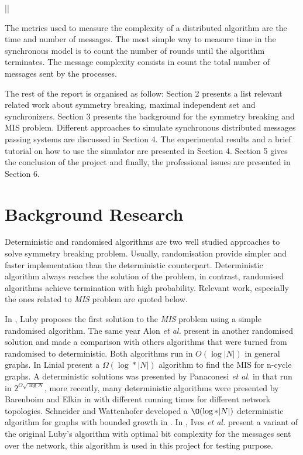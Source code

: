||\documentclass[11pt]{article} %
\theoremstyle{plain}
\theoremstyle{definition}
\begin{document}
The metrics used to measure the complexity of a distributed algorithm are the time and number of messages. The most simple way to measure time in the synchronous model is to count the number of rounds until the algorithm terminates. The message complexity consists in count the total number of messages sent by the processes. 

The rest of the report is organised as follow: Section 2 presents a list relevant related work about symmetry breaking, maximal independent set and synchronizers. Section 3 presents the background for the symmetry breaking and MIS problem. Different approaches to simulate synchronous distributed messages passing systems are discussed in Section 4. The experimental results and a brief tutorial on how to use the simulator are presented in Section 4. Section 5 gives the conclusion of the project and finally, the professional issues are presented in Section 6. 




\section{Background Research}
 
Deterministic and randomised algorithms are two well studied approaches to solve symmetry breaking problem. Usually, randomisation provide simpler and faster implementation than the deterministic counterpart. Deterministic algorithm always reaches the solution of the problem, in contrast, randomised algorithms achieve termination with high probability. Relevant work, especially the ones related to \textit{MIS} problem are quoted below.

In \cite{luby1986simple}, Luby proposes the first solution to the \textit{MIS} problem using a simple randomised algorithm. The same year Alon \textit{et al.} present in \cite{alon1986fast} another randomised solution and made a comparison with others algorithms that were turned from randomised to deterministic. Both algorithms run in $O(\log |N|)$ in general graphs. In \cite{linial1992locality} Linial present a $\Omega(\log* |N|)$ algorithm to find the MIS for n-cycle graphs. A deterministic solutions was presented by Panaconesi \textit{et al.} in \cite{panconesi1996complexity} that run in $2^{O\sqrt{\log N}}$, more recently, many deterministic algorithms were presented by Barenboim and Elkin in \cite{barenboim2010sublogarithmic} with different running times for different network topologies. Schneider and Wattenhofer developed a $\O(\log* |N|)$ deterministic algorithm for graphs with bounded growth in \cite{barenboim2010sublogarithmic}. In \cite{yves2009optimal}, Ives \textit{et al.} present a variant of the original Luby's algorithm with optimal bit complexity for the messages sent over the network, this algorithm is used in this project for testing purpose.
\end{document}
